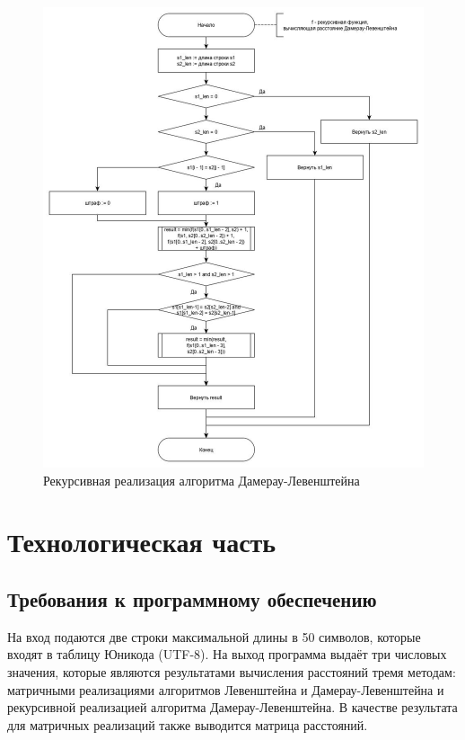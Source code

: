 \documentclass[12pt, a4paper]{report}
\begin{document}
	\begin{figure}
		\centering
		\includegraphics[scale=0.5]{damleven_r}
		\caption{Рекурсивная реализация алгоритма Дамерау-Левенштейна}
		\label{fig:damlevenr}
	\end{figure}

	\newpage
	
	\chapter{Технологическая часть}
	\section{Требования к программному обеспечению}
	На вход подаются две строки максимальной длины в 50 символов, которые входят в таблицу Юникода (UTF-8). На выход программа выдаёт три числовых значения, которые являются результатами вычисления расстояний тремя методам: матричными реализациями алгоритмов Левенштейна и Дамерау-Левенштейна и рекурсивной реализацией алгоритма Дамерау-Левенштейна. В качестве результата для матричных реализаций также выводится матрица расстояний.
\end{document}
